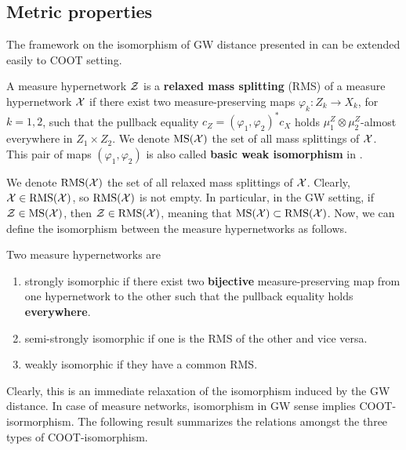 \subsection{Metric properties}
The framework on the isomorphism of GW distance presented in 
can be extended easily to COOT setting.
\begin{definition}
  A measure hypernetwork $\mathcal Z$ is a \textbf{relaxed mass splitting} (RMS) of a
  measure hypernetwork $\mathcal X$ if there exist two measure-preserving maps
  $\varphi_k: Z_k \to X_k$, for $k=1,2$, such that the pullback equality
  $c_Z = (\varphi_1, \varphi_2)^*c_X$ holds $\mu^Z_1 \otimes \mu_2^Z$-almost everywhere
  in $Z_1 \times Z_2$. We denote $\text{MS}(\mathcal X)$ the set of all mass splittings
  of $\mathcal X$. This pair of maps $(\varphi_1, \varphi_2)$ is also called
  \textbf{basic weak isomorphism} in \citep{Chowdhury21b}.
\end{definition}
We denote $\text{RMS}(\mathcal X)$ the set of all relaxed mass splittings of $\mathcal X$. Clearly,
$\mathcal X \in \text{RMS}(\mathcal X)$, so $\text{RMS}(\mathcal X)$ is not empty.
In particular, in the GW setting, if $\mathcal Z \in \text{MS}(\mathcal X)$, then $\mathcal Z \in \text{RMS}(\mathcal X)$, meaning that
$\text{MS}(\mathcal X) \subset \text{RMS}(\mathcal X)$. Now, we can define the isomorphism between the measure hypernetworks
as follows.
\begin{definition} \label{coot_isomorphic}
  Two measure hypernetworks are
  \begin{enumerate}
    \item strongly isomorphic if there exist two \textbf{bijective}
    measure-preserving map from one hypernetwork to the other such that the pullback equality holds
    \textbf{everywhere}.
    \item semi-strongly isomorphic if one is the RMS of the other and vice versa.
    \item weakly isomorphic if they have a common RMS.
  \end{enumerate}
\end{definition}
Clearly, this is an immediate relaxation of the isomorphism induced by the GW distance.
In case of measure networks, isomorphism in GW sense implies COOT-isormorphism.
The following result summarizes the relations amongst the three types of COOT-isomorphism.
